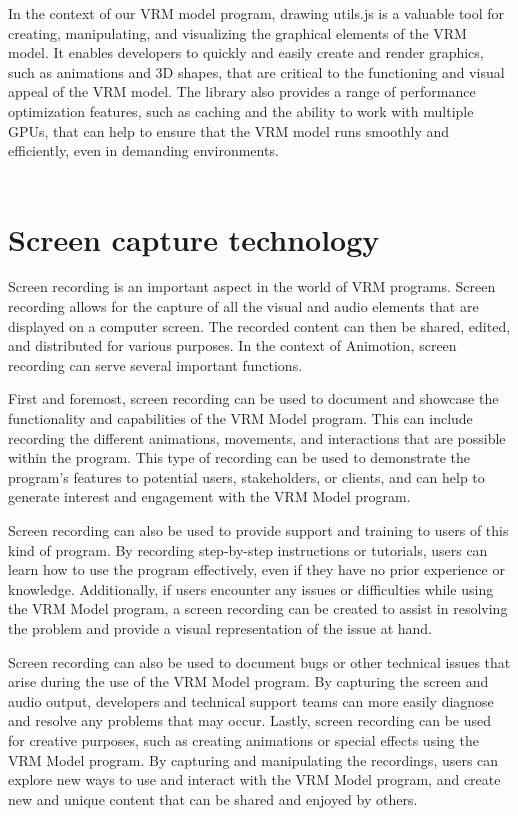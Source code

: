 In the context of our VRM model program, drawing utils.js is a valuable tool for 
creating, manipulating, and visualizing the graphical elements of the VRM model. 
It enables developers to quickly and easily create and render graphics, such as 
animations and 3D shapes, that are critical to the functioning and visual appeal 
of the VRM model. The library also provides a range of performance optimization 
features, such as caching and the ability to work with multiple GPUs, 
that can help to ensure that the VRM model runs smoothly and efficiently, even in demanding environments.
\\
\\
\section{Screen capture technology}
Screen recording is an important aspect in the world of VRM programs. 
Screen recording allows for the capture of all the visual and audio elements that are displayed 
on a computer screen. The recorded content can then be shared, edited, and distributed for various 
purposes. In the context of Animotion, screen recording can serve several important functions.

First and foremost, screen recording can be used to document and showcase the functionality and 
capabilities of the VRM Model program. This can include recording the different animations, movements, 
and interactions that are possible within the program. This type of recording can be used to demonstrate 
the program's features to potential users, stakeholders, or clients, and can help to generate interest 
and engagement with the VRM Model program.

Screen recording can also be used to provide support and training to users of this kind of program. 
By recording step-by-step instructions or tutorials, users can learn how to use the program effectively, 
even if they have no prior experience or knowledge. Additionally, if users encounter any issues or 
difficulties while using the VRM Model program, a screen recording can be created to assist in resolving 
the problem and provide a visual representation of the issue at hand.

Screen recording can also be used to document bugs or other technical issues that arise during the use 
of the VRM Model program. By capturing the screen and audio output, developers and technical support 
teams can more easily diagnose and resolve any problems that may occur.
Lastly, screen recording can be used for creative purposes, such as creating animations or special 
effects using the VRM Model program. By capturing and manipulating the recordings, users can explore 
new ways to use and interact with the VRM Model program, and create new and unique content that 
can be shared and enjoyed by others.
\\
\\
